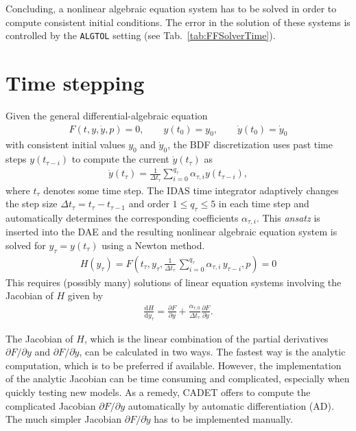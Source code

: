 Concluding, a nonlinear algebraic equation system has to be solved in order to compute consistent initial conditions.
The error in the solution of these systems is controlled by the \texttt{ALGTOL} setting (see Tab.~\ref{tab:FFSolverTime}).

\section{Time stepping}\label{sec:SimTimeIntegration}

Given the general differential-algebraic equation
\begin{align*}
	F(t, y, \dot{y}, p) = 0, \qquad y\left(t_0 \right) = y_0, \qquad \dot{y}\left(t_0 \right) = \dot{y}_0
\end{align*}
with consistent initial values $y_0$ and $\dot{y}_0$, the BDF discretization uses past time steps $y\left( t_{\tau - i} \right)$ to compute the current $\dot{y}\left(t_\tau\right)$ as
\begin{align*}
	\dot{y}\left(t_\tau\right) = \frac{1}{\Delta t_\tau} \sum_{i=0}^{q_{\tau}} \alpha_{\tau,i} y\left(t_{\tau-i}\right),
\end{align*}
where $t_\tau$ denotes some time step. 
The IDAS time integrator adaptively changes the step size ${\Delta t_\tau = t_\tau-t_{\tau-1}}$ and order $1 \le q_{\tau} \le 5$ in each time step and automatically determines the corresponding coefficients $\alpha_{\tau,i}$.
This \textit{ansatz} is inserted into the DAE and the resulting nonlinear algebraic equation system is solved for $y_{\tau} = y\left( t_\tau \right)$ using a Newton method.
\begin{align}
	H(y_\tau) = F\left(t_\tau,y_\tau,\frac{1}{\Delta t_\tau} \,\sum_{i=0}^{q_\tau}{\alpha_{\tau,i} \, y_{\tau-i}}, p\right) = 0 \label{eq:BDFNonlinSystem}
\end{align}
This requires (possibly many) solutions of linear equation systems involving the Jacobian of $H$ given by
\begin{align*}
	\frac{\mathrm{d}H}{\mathrm{d}y_\tau} = \frac{\partial F}{\partial y} + \frac{\alpha_{\tau,0}}{\Delta t_\tau} \frac{\partial F}{\partial \dot{y}}.
\end{align*}

The Jacobian of $H$, which is the linear combination of the partial derivatives $\partial F / \partial y$ and $\partial F / \partial \dot{y}$, can be calculated in two ways.
The fastest way is the analytic computation, which is to be preferred if available.
However, the implementation of the analytic Jacobian can be time consuming and complicated, especially when quickly testing new models.
As a remedy, CADET offers to compute the complicated Jacobian $\partial F / \partial y$ automatically by automatic differentiation (AD).
The much simpler Jacobian $\partial F / \partial \dot{y}$ has to be implemented manually.

